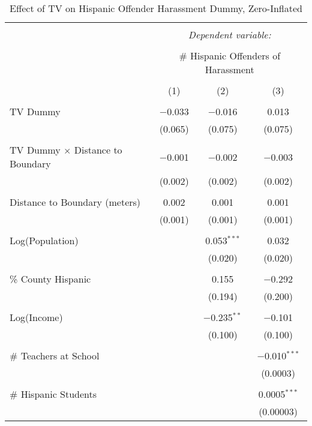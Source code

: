 
\begin{table}[!htbp] \centering 
  \caption{Effect of TV on Hispanic Offender Harassment Dummy, Zero-Inflated} 
  \label{} 
\begin{tabular}{@{\extracolsep{-2pt}}lccc} 
\\[-1.8ex]\hline 
\hline \\[-1.8ex] 
 & \multicolumn{3}{c}{\textit{Dependent variable:}} \\ 
\cline{2-4} 
\\[-1.8ex] & \multicolumn{3}{c}{\# Hispanic Offenders of Harassment} \\ 
\\[-1.8ex] & (1) & (2) & (3)\\ 
\hline \\[-1.8ex] 
 TV Dummy & $-$0.033 & $-$0.016 & 0.013 \\ 
  & (0.065) & (0.075) & (0.075) \\ 
  & & & \\ 
 TV Dummy $\times$ Distance to Boundary & $-$0.001 & $-$0.002 & $-$0.003 \\ 
  & (0.002) & (0.002) & (0.002) \\ 
  & & & \\ 
 Distance to Boundary (meters) & 0.002 & 0.001 & 0.001 \\ 
  & (0.001) & (0.001) & (0.001) \\ 
  & & & \\ 
 Log(Population) &  & 0.053$^{***}$ & 0.032 \\ 
  &  & (0.020) & (0.020) \\ 
  & & & \\ 
 \% County Hispanic &  & 0.155 & $-$0.292 \\ 
  &  & (0.194) & (0.200) \\ 
  & & & \\ 
 Log(Income) &  & $-$0.235$^{**}$ & $-$0.101 \\ 
  &  & (0.100) & (0.100) \\ 
  & & & \\ 
 \# Teachers at School &  &  & $-$0.010$^{***}$ \\ 
  &  &  & (0.0003) \\ 
  & & & \\ 
 \# Hispanic Students &  &  & 0.0005$^{***}$ \\ 
  &  &  & (0.00003) \\ 

\end{tabular}
\end{table}
